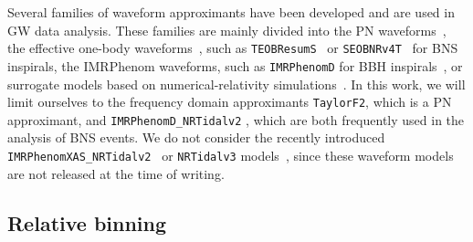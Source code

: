 \documentclass[prd,twocolumn,a4paper,floatfix,nofootinbib,preprintnumbers,superscriptaddress]{revtex4-1}
\begin{document}
\noindent Several families of waveform approximants have been developed and are used in \ac{GW} data analysis. These families are mainly divided into the \ac{PN} waveforms~\cite{Buonanno:2009zt, Blanchet:2013haa}, the effective one-body waveforms~\cite{Buonanno:1998gg, Buonanno:2000ef, Damour:2009zoi}, such as \texttt{TEOBResumS}~\cite{Bernuzzi:2014owa,Nagar:2018zoe,Akcay:2018yyh} or \texttt{SEOBNRv4T}~\cite{Hinderer:2016eia,Steinhoff:2016rfi} for \ac{BNS} inspirals, the \ac{IMRPhenom} waveforms, such as \texttt{IMRPhenomD} for \ac{BBH} inspirals~\cite{Husa:2015iqa, Khan:2015jqa}, or surrogate models based on numerical-relativity simulations~\cite{Varma:2019csw}. In this work, we will limit ourselves to the frequency domain approximants \texttt{TaylorF2}, which is a \ac{PN} approximant, and \texttt{IMRPhenomD\_NRTidalv2} \cite{Dietrich:2017aum, Dietrich:2019kaq}, which are both frequently used in the analysis of \ac{BNS} events.  We do not consider the recently introduced  \texttt{IMRPhenomXAS\_NRTidalv2}~\cite{Colleoni:2023czp} or \texttt{NRTidalv3} models~\cite{Abac:2023ujg}, since these waveform models are not released at the time of writing. 

\subsection{Relative binning}\label{sec: relative binning}
\end{document}
